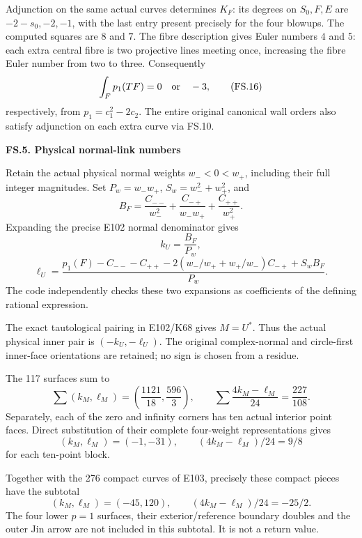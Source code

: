 Adjunction on the same actual curves
determines \(K_F\): its degrees on
\(S_0,F,E\) are \(-2-s_0,-2,-1\),
with the last entry present precisely
for the four blowups. The computed
squares are \(8\) and \(7\).
The fibre description gives Euler
numbers \(4\) and \(5\): each extra
central fibre is two projective lines
meeting once, increasing the fibre
Euler number from two to three.
Consequently
\[
 \int_Fp_1(TF)=0\quad\hbox{or}\quad-3,                    \tag{FS.16}
\]
respectively, from \(p_1=c_1^2-2c_2\).
The entire original canonical wall
orders also satisfy adjunction on
each extra curve via FS.10.

\par

\medskip\noindent\textbf{FS.5. Physical normal-link numbers}

\par\nobreak

Retain the actual physical normal
weights \(w_-<0<w_+\), including
their full integer magnitudes.
Set \(P_w=w_-w_+\), \(S_w=w_-^2+w_+^2\), and
\[
 B_F=\frac{C_{--}}{w_-^2}
       +\frac{C_{-+}}{w_-w_+}
       +\frac{C_{++}}{w_+^2}.
\]
Expanding the precise E102 normal
denominator gives
\[
 k_U=\frac{B_F}{P_w},                                     \tag{FS.17}
\]
\[
 \ell_U=\frac{p_1(F)-C_{--}-C_{++}
   -2(w_-/w_++w_+/w_-)C_{-+}
   +S_w B_F}{P_w}.                                        \tag{FS.18}
\]
The code independently checks these
two expansions as coefficients of
the defining rational expression.

The exact tautological pairing
in E102/K68 gives \(M=U^*\).
Thus the actual physical inner pair
is \((-k_U,-\ell_U)\). The original
complex-normal and circle-first
inner-face orientations are retained;
no sign is chosen from a residue.

The 117 surfaces sum to
\[
 \sum(k_M,\ell_M)
       =\left(\frac{1121}{18},\frac{596}{3}\right),
 \qquad
 \sum\frac{4k_M-\ell_M}{24}=\frac{227}{108}.                \tag{FS.19}
\]
Separately, each of the zero and
infinity corners has ten actual
interior point faces. Direct
substitution of their complete
four-weight representations gives
\[
 (k_M,\ell_M)=(-1,-31),\qquad
 (4k_M-\ell_M)/24=9/8                                    \tag{FS.20}
\]
for each ten-point block.

Together with the 276 compact curves
of E103, precisely these compact
pieces have the subtotal
\[
 (k_M,\ell_M)=(-45,120),\qquad
 (4k_M-\ell_M)/24=-25/2.                                 \tag{FS.21}
\]
The four lower \(p=1\) surfaces,
their exterior/reference boundary
doubles and the outer Jin arrow
are not included in this subtotal.
It is not a return value.

